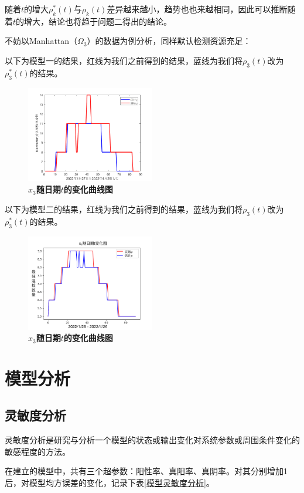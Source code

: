\documentclass[withoutpreface,bwprint]{cumcmthesis} %
\begin{document}
随着$t$的增大$\rho^*_k(t)$与$\rho_k(t)$差异越来越小，趋势也也来越相同，因此可以推断随着$t$的增大，结论也将趋于问题二得出的结论。

不妨以Manhattan（$\Omega_3$）的数据为例分析，同样默认检测资源充足：

以下为模型一的结果，红线为我们之前得到的结果，蓝线为我们将$\rho_3(t)$改为$\rho^*_3(t)$的结果。
\begin{figure}[H]
\centering
\includegraphics[width=0.5\textwidth]{Manhattan对比混检样本数量1.png}
\caption{\textbf{$x_3$随日期$t$的变化曲线图}}
\label{pro1}
\end{figure}

以下为模型二的结果，红线为我们之前得到的结果，蓝线为我们将$\rho_3(t)$改为$\rho^*_3(t)$的结果。
\begin{figure}[H]
\centering
\includegraphics[width=0.5\textwidth]{q3.png}
\caption{\textbf{$x_3$随日期$t$的变化曲线图}}
\label{pro1}
\end{figure}

\section{模型分析} 
\subsection{灵敏度分析}
灵敏度分析是研究与分析一个模型的状态或输出变化对系统参数或周围条件变化的敏感程度的方法。

在建立的模型中，共有三个超参数：阳性率、真阳率、真阴率。对其分别增加1后，对模型均方误差的变化，记录下表\ref{模型灵敏度分析}。
\end{document}
